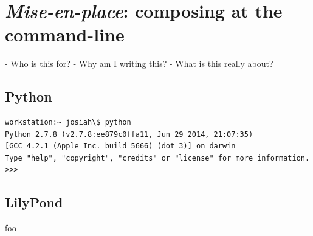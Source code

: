 \section{\emph{Mise-en-place}: composing at the command-line}

\begin{markdown}
-   Who is this for?
-   Why am I writing this?
-   What is this really about?
\end{markdown}

\subsection{Python}

\begin{singlespacing}
\vspace{-0.5\baselineskip}
\begin{lstlisting}
workstation:~ josiah\$ python
Python 2.7.8 (v2.7.8:ee879c0ffa11, Jun 29 2014, 21:07:35)
[GCC 4.2.1 (Apple Inc. build 5666) (dot 3)] on darwin
Type "help", "copyright", "credits" or "license" for more information.
>>>
\end{lstlisting}
\end{singlespacing}

\subsection{LilyPond}

foo

